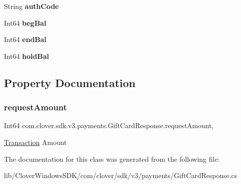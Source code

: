\begin{DoxyCompactItemize}
String {\bfseries auth\+Code}
\item 
\mbox{\label{classcom_1_1clover_1_1sdk_1_1v3_1_1payments_1_1_gift_card_response_a1fa40f23e06b6fedbbbe1183d8e48f7f}} 
Int64 {\bfseries beg\+Bal}
\item 
\mbox{\label{classcom_1_1clover_1_1sdk_1_1v3_1_1payments_1_1_gift_card_response_ababd9ea6bc9f9cc344a70353900749c2}} 
Int64 {\bfseries end\+Bal}
\item 
\mbox{\label{classcom_1_1clover_1_1sdk_1_1v3_1_1payments_1_1_gift_card_response_a83025f4af03fa442dd5fd3d86d5c599a}} 
Int64 {\bfseries hold\+Bal}
\end{DoxyCompactItemize}


\subsection{Property Documentation}
\mbox{\label{classcom_1_1clover_1_1sdk_1_1v3_1_1payments_1_1_gift_card_response_ac8eb07f2756ebc3b1f8d91ae48ced1d2}} 
\subsubsection{\texorpdfstring{request\+Amount}{requestAmount}}
{\footnotesize\ttfamily Int64 com.\+clover.\+sdk.\+v3.\+payments.\+Gift\+Card\+Response.\+request\+Amount\hspace{0.3cm}{\ttfamily [get]}, {\ttfamily [set]}}



\hyperlink{classcom_1_1clover_1_1sdk_1_1v3_1_1payments_1_1_transaction}{Transaction} Amount 



The documentation for this class was generated from the following file\+:\begin{DoxyCompactItemize}
\item 
lib/\+Clover\+Windows\+S\+D\+K/com/clover/sdk/v3/payments/Gift\+Card\+Response.\+cs\end{DoxyCompactItemize}
